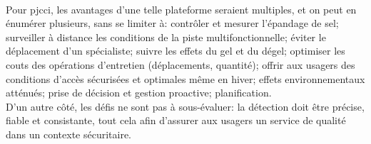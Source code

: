 \vspace{\baselineskip}
\\
\noindent Pour \acrshort{pjcci}, les avantages d'une telle plateforme seraient multiples, et on peut en énumérer plusieurs, sans se limiter à: contrôler et mesurer l'épandage de sel; surveiller à distance les conditions de la piste multifonctionnelle; éviter le déplacement d'un spécialiste; suivre les effets du gel et du dégel; optimiser les couts des opérations d'entretien (déplacements, quantité); offrir aux usagers des conditions d'accès sécurisées et optimales même en hiver; effets environnementaux atténués; prise de décision et gestion proactive; planification.
\vspace{\baselineskip}
\\
\noindent D'un autre côté, les défis ne sont pas à sous-évaluer: la détection doit être précise, fiable et consistante, tout cela afin d'assurer aux usagers un service de qualité dans un contexte sécuritaire.